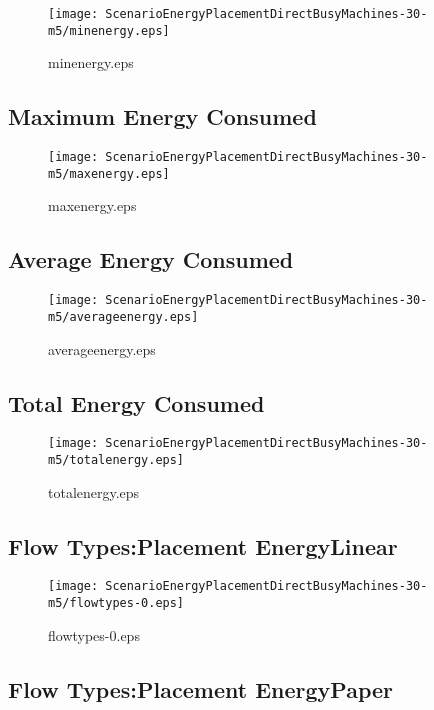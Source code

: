 \documentclass{elsart}
\begin{document}
\begin{figure}[ht]
\centering
\texttt{[image: ScenarioEnergyPlacementDirectBusyMachines-30-m5/minenergy.eps]}
\caption{minenergy.eps}\label{fig:minenergy}
\end{figure}

\clearpage
\subsection{Maximum Energy Consumed}

\begin{figure}[ht]
\centering
\texttt{[image: ScenarioEnergyPlacementDirectBusyMachines-30-m5/maxenergy.eps]}
\caption{maxenergy.eps}\label{fig:maxenergy}
\end{figure}

\clearpage
\subsection{Average Energy Consumed}

\begin{figure}[ht]
\centering
\texttt{[image: ScenarioEnergyPlacementDirectBusyMachines-30-m5/averageenergy.eps]}
\caption{averageenergy.eps}\label{fig:averageenergy}
\end{figure}

\clearpage
\subsection{Total Energy Consumed}

\begin{figure}[ht]
\centering
\texttt{[image: ScenarioEnergyPlacementDirectBusyMachines-30-m5/totalenergy.eps]}
\caption{totalenergy.eps}\label{fig:totalenergy}
\end{figure}

\clearpage
\subsection{Flow Types:Placement EnergyLinear}

\begin{figure}[ht]
\centering
\texttt{[image: ScenarioEnergyPlacementDirectBusyMachines-30-m5/flowtypes-0.eps]}
\caption{flowtypes-0.eps}\label{fig:flowtypes-0}
\end{figure}

\clearpage
\subsection{Flow Types:Placement EnergyPaper}
\end{document}
